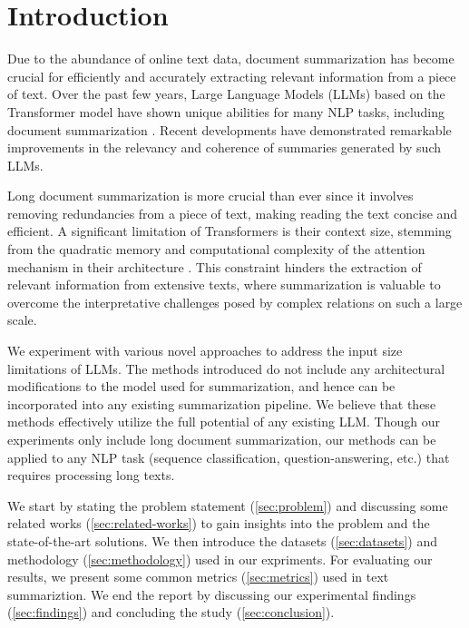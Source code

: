 \section{Introduction}
\label{sec:introduction}

Due to the abundance of online text data, document summarization has become crucial
for efficiently and accurately extracting relevant information from a piece of text.
Over the past few years, Large Language Models (LLMs) based on the Transformer model
\cite{vaswani2017attention} have shown unique abilities for many NLP tasks, including
document summarization \cite{yadav2023state}.
Recent developments have demonstrated remarkable improvements in the relevancy and
coherence of summaries generated by such LLMs.

Long document summarization is more crucial than ever since it involves removing redundancies
from a piece of text, making reading the text concise and efficient.
A significant limitation of Transformers is their context size, stemming from the quadratic
memory and computational complexity of the attention mechanism in their architecture
\cite{du2023improving}.
This constraint hinders the extraction of relevant information from extensive texts, where
summarization is valuable to overcome the interpretative challenges posed by complex
relations on such a large scale.

We experiment with various novel approaches to address the input size limitations of LLMs.
The methods introduced do not include any architectural modifications to the model used for
summarization, and hence can be incorporated into any existing summarization pipeline.
We believe that these methods effectively utilize the full potential of any existing LLM.
Though our experiments only include long document summarization, our methods can be applied
to any NLP task (sequence classification, question-answering, etc.) that requires processing
long texts.

We start by stating the problem statement (\ref{sec:problem}) and discussing some related works
(\ref{sec:related-works}) to gain insights into the problem and the state-of-the-art solutions.
We then introduce the datasets (\ref{sec:datasets}) and methodology (\ref{sec:methodology}) used
in our expriments.
For evaluating our results, we present some common metrics (\ref{sec:metrics}) used in text
summariztion.
We end the report by discussing our experimental findings (\ref{sec:findings}) and concluding
the study (\ref{sec:conclusion}).
